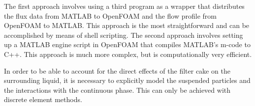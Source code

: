 The first approach involves using a third program as a wrapper that distributes the flux data from MATLAB to OpenFOAM and the flow profile from OpenFOAM to MATLAB. This approach is the most straightforward and can be accomplished by means of shell scripting. The second approach involves setting up a MATLAB engine script in OpenFOAM that compiles MATLAB's m-code to C++. This approach is much more complex, but is computationally very efficient. \par
In order to be able to account for the direct effects of the filter cake on the surrounding liquid, it is necessary to explicitly model the suspended particles and the interactions with the continuous phase. This can only be achieved with discrete element methods.


